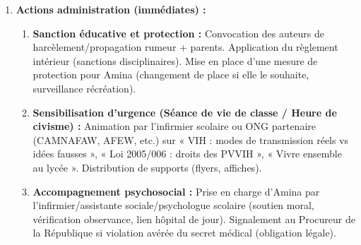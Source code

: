 \documentclass[11pt]{article}
\begin{document}
\begin{exoresolu}
\begin{enumerate}
\begin{itemize}
        \item « Si Amina suit son traitement (ce qui est probable), sa charge virale est indétectable : elle \textbf{ne transmet pas le VIH} (I=I). »
    \end{itemize}
    \item \textbf{Actions administration (immédiates) :}
    \begin{enumerate}
        \item \textbf{Sanction éducative et protection :} Convocation des auteurs de harcèlement/propagation rumeur + parents. Application du règlement intérieur (sanctions disciplinaires). Mise en place d'une mesure de protection pour Amina (changement de place si elle le souhaite, surveillance récréation).
        \item \textbf{Sensibilisation d'urgence (Séance de vie de classe / Heure de civisme) :} Animation par l'infirmier scolaire ou ONG partenaire (CAMNAFAW, AFEW, etc.) sur « VIH : modes de transmission réels vs idées fausses », « Loi 2005/006 : droits des PVVIH », « Vivre ensemble au lycée ». Distribution de supports (flyers, affiches).
        \item \textbf{Accompagnement psychosocial :} Prise en charge d'Amina par l'infirmier/assistante sociale/psychologue scolaire (soutien moral, vérification observance, lien hôpital de jour). Signalement au Procureur de la République si violation avérée du secret médical (obligation légale).
    \end{enumerate}
\end{enumerate}
\end{exoresolu}
\end{document}
